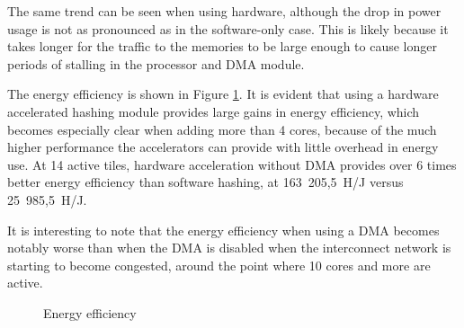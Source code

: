 The same trend can be seen when using hardware, although the drop in power usage is not as pronounced as in the software-only
case. This is likely because it takes longer for the traffic to the memories to be large enough to cause longer periods of
stalling in the processor and DMA module.

The energy efficiency is shown in Figure \ref{fig:efficiency-plot}. It is evident that using a hardware accelerated
hashing module provides large gains in energy efficiency, which becomes especially clear when adding more than 4 cores,
because of the much higher performance the accelerators can provide with little overhead in energy use. At 14 active
tiles, hardware acceleration without DMA provides over 6 times better energy efficiency than software hashing,
at 163~205,5~H/J versus 25~985,5~H/J.

It is interesting to note that the energy efficiency when using a DMA becomes notably worse than when the DMA is disabled
when the interconnect network is starting to become congested, around the point where 10 cores and more are active.

\begin{figure}
	\centering
	\caption{Energy efficiency}
	\label{fig:efficiency-plot}
\end{figure}

